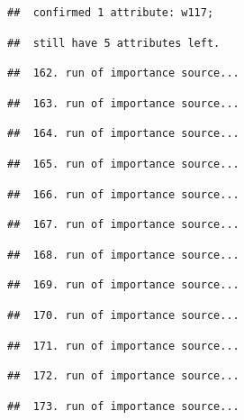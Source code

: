 \documentclass[
]{article}
\begin{document}
\begin{verbatim}
##  confirmed 1 attribute: w117;
\end{verbatim}

\begin{verbatim}
##  still have 5 attributes left.
\end{verbatim}

\begin{verbatim}
##  162. run of importance source...
\end{verbatim}

\begin{verbatim}
##  163. run of importance source...
\end{verbatim}

\begin{verbatim}
##  164. run of importance source...
\end{verbatim}

\begin{verbatim}
##  165. run of importance source...
\end{verbatim}

\begin{verbatim}
##  166. run of importance source...
\end{verbatim}

\begin{verbatim}
##  167. run of importance source...
\end{verbatim}

\begin{verbatim}
##  168. run of importance source...
\end{verbatim}

\begin{verbatim}
##  169. run of importance source...
\end{verbatim}

\begin{verbatim}
##  170. run of importance source...
\end{verbatim}

\begin{verbatim}
##  171. run of importance source...
\end{verbatim}

\begin{verbatim}
##  172. run of importance source...
\end{verbatim}

\begin{verbatim}
##  173. run of importance source...
\end{verbatim}
\end{document}
